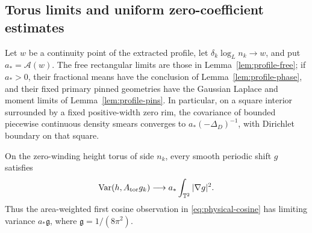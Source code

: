 \subsection{Torus limits and uniform zero-coefficient estimates}

\begin{proposition}\label{prop:gaussian-profile}
Let $w$ be a continuity point of the extracted profile, let
$\delta_k\log_Ln_k\to w$, and put $a_*=\mathcal A(w)$.
The free rectangular limits are those in
Lemma~\ref{lem:profile-free}; if $a_*>0$, their fractional means have
the conclusion of Lemma~\ref{lem:profile-phase}, and their fixed
primary pinned geometries have the Gaussian Laplace and moment limits
of Lemma~\ref{lem:profile-pins}. In particular, on a square interior
surrounded by a fixed positive-width zero rim, the covariance of
bounded piecewise continuous density smears converges to
$a_*(-\Delta_D)^{-1}$, with
Dirichlet boundary on that square.

On the zero-winding height torus of side $n_k$, every smooth periodic
shift $g$ satisfies
\begin{equation}\label{eq:profile-torus}
 \operatorname{Var}(h,A_{\mathrm{tor}}g_k)\longrightarrow
                         a_*\int_{\mathbb T^2}|\nabla g|^2.
\end{equation}
Thus the area-weighted first cosine observation in
\eqref{eq:physical-cosine} has limiting variance
$a_*\mathfrak g$, where $\mathfrak g=1/(8\pi^2)$.
\end{proposition}

